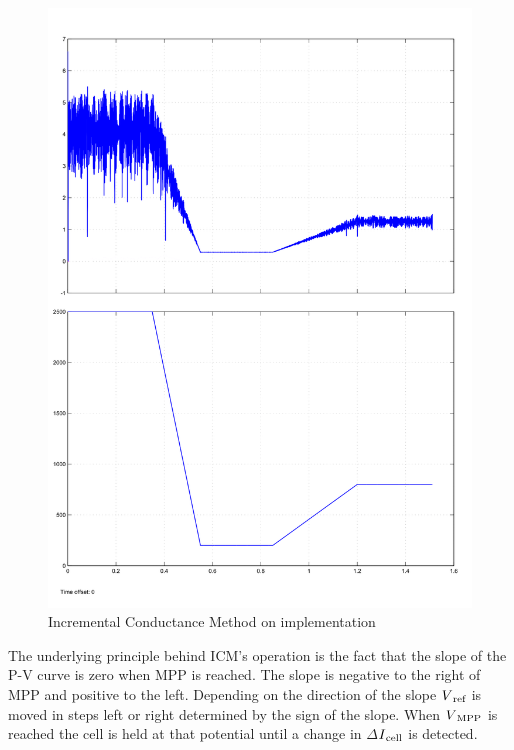  \begin{figure}[H]
	   \begin{center}
		   \includegraphics[width=\textwidth]{images/inC_stateflow_changing_lux-1}
		   \caption{Incremental Conductance Method on implementation  }
		   \label{fig:Inc_result}
	   \end{center}
  \end{figure}
 The underlying principle behind \ac{ICM}'s operation is the fact that the slope of the P-V curve is zero when \ac{MPP} is reached. The slope is negative to the right of \ac{MPP} and positive to the left.
 Depending on the direction of the slope $V\textsubscript{ref}$ is moved in steps left or right determined by the sign of the slope. When $V\textsubscript{MPP}$ is reached the cell is held at that potential until a change in $\varDelta$$I\textsubscript{cell}$ is detected.\\
 
